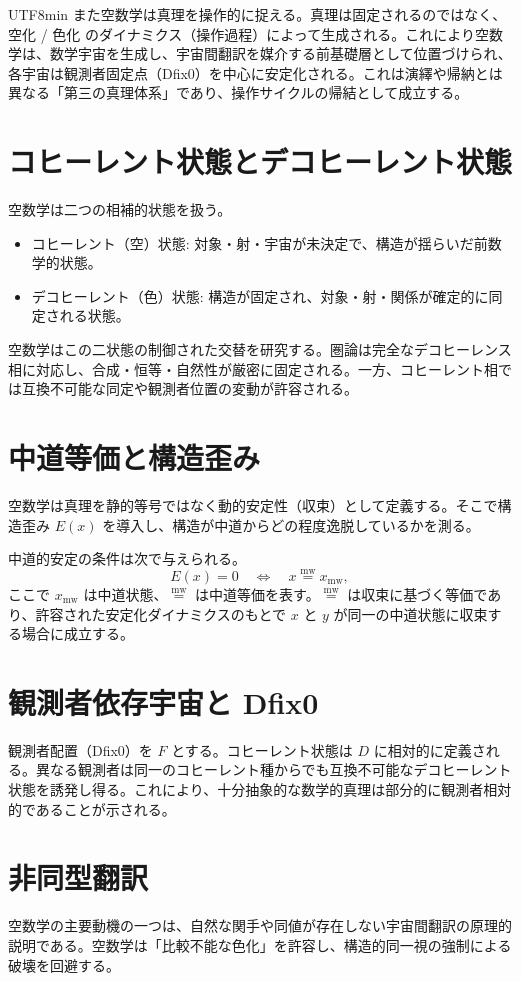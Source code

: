 \documentclass[11pt]{article}
\newcommand{\mweq}{\mathrel{\overset{\mathrm{mw}}{=}}}
\begin{document}
\begin{CJK}{UTF8}{min}
また空数学は真理を操作的に捉える。真理は固定されるのではなく、空化 / 色化 のダイナミクス（操作過程）によって生成される。これにより空数学は、数学宇宙を生成し、宇宙間翻訳を媒介する前基礎層として位置づけられ、各宇宙は観測者固定点（Dfix0）を中心に安定化される。これは演繹や帰納とは異なる「第三の真理体系」であり、操作サイクルの帰結として成立する。

\section{コヒーレント状態とデコヒーレント状態}
空数学は二つの相補的状態を扱う。

\begin{itemize}
    \item コヒーレント（空）状態: 対象・射・宇宙が未決定で、構造が揺らいだ前数学的状態。
    \item デコヒーレント（色）状態: 構造が固定され、対象・射・関係が確定的に同定される状態。
\end{itemize}

空数学はこの二状態の制御された交替を研究する。圏論は完全なデコヒーレンス相に対応し、合成・恒等・自然性が厳密に固定される。一方、コヒーレント相では互換不可能な同定や観測者位置の変動が許容される。

\section{中道等価と構造歪み}
空数学は真理を静的等号ではなく動的安定性（収束）として定義する。そこで構造歪み $E(x)$ を導入し、構造が中道からどの程度逸脱しているかを測る。

中道的安定の条件は次で与えられる。
\[
E(x) = 0 \quad \Longleftrightarrow \quad x \mweq x_{\mathrm{mw}},
\]
ここで $x_{\mathrm{mw}}$ は中道状態、$\mweq$ は中道等価を表す。$\mweq$ は収束に基づく等価であり、許容された安定化ダイナミクスのもとで $x$ と $y$ が同一の中道状態に収束する場合に成立する。

\section{観測者依存宇宙と Dfix0}
観測者配置（Dfix0）を $F$ とする。コヒーレント状態は $D$ に相対的に定義される。異なる観測者は同一のコヒーレント種からでも互換不可能なデコヒーレント状態を誘発し得る。これにより、十分抽象的な数学的真理は部分的に観測者相対的であることが示される。

\section{非同型翻訳}
空数学の主要動機の一つは、自然な関手や同値が存在しない宇宙間翻訳の原理的説明である。空数学は「比較不能な色化」を許容し、構造的同一視の強制による破壊を回避する。


\end{CJK}
\end{document}
